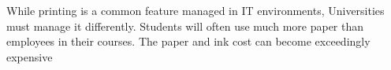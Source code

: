 While printing is a common feature managed in IT environments, Universities must manage it differently.  Students will often use much more paper than employees in their courses.  The paper and ink cost can become exceedingly expensive 





